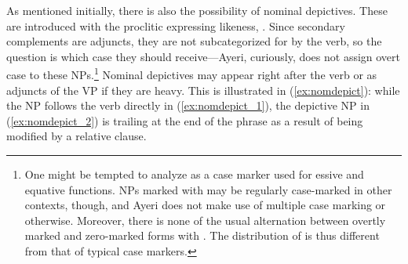 As mentioned initially, there is also the possibility of nominal depictives.
These are introduced with the proclitic expressing likeness, .
Since secondary complements are adjuncts, they are not subcategorized for by
the verb, so the question is which case they should receive---Ayeri, curiously,
does not assign overt case to these NPs.\footnote{One might be tempted to analyze
 as a case marker used for essive and equative functions.
NPs marked with  may be regularly case-marked in other contexts,
though, and Ayeri does not make use of multiple case marking or
 otherwise. Moreover, there is none of the usual alternation
between overtly marked and zero-marked forms with . The
distribution of  is thus different from that of typical case
markers.} Nominal depictives may appear right after the verb or as adjuncts of
the VP if they are heavy. This is illustrated in (\ref{ex:nomdepict}): while
the NP  follows the verb directly in
(\ref{ex:nomdepict_1}), the depictive NP  in (\ref{ex:nomdepict_2}) is trailing at the
end of the phrase as a result of being modified by a relative clause.

